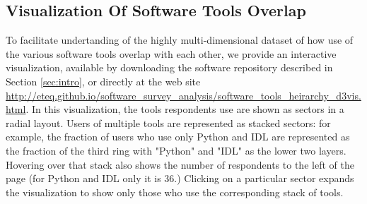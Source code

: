 \subsection{Visualization Of Software Tools Overlap}
\label{ssec:d3viz}

To facilitate undertanding of the highly multi-dimensional dataset of how use of the various software tools overlap with each other, we provide an interactive visualization, available by downloading the software repository described in Section \ref{sec:intro}, or directly at the web site \url{http://eteq.github.io/software_survey_analysis/software_tools_heirarchy_d3vis.html}. In this visualization, the tools respondents use are shown as sectors in a radial layout.  Users of multiple tools are represented as stacked sectors: for example, the fraction of users who use only Python and IDL are represented as the fraction of the third ring with "Python" and "IDL" as the lower two layers.  Hovering over that stack also shows the number of respondents to the left of the page (for Python and IDL only it is 36.)  Clicking on a particular sector expands the visualization to show only those who use the corresponding stack of tools.